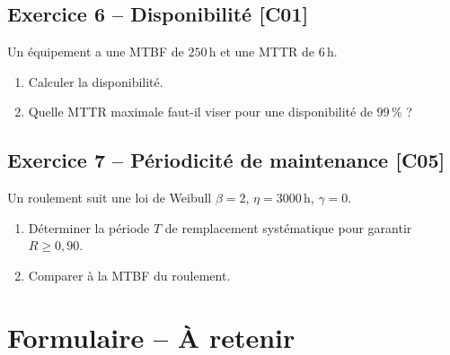 \documentclass[a4paper,11pt]{article}
\begin{document}
\subsection*{Exercice 6 -- Disponibilité \hfill {\normalsize\color{uimmred}[C01]}}
Un équipement a une MTBF de $250$\,h et une MTTR de $6$\,h.
\begin{enumerate}[label=\alph*)]
  \item Calculer la disponibilité.
  \item Quelle MTTR maximale faut-il viser pour une disponibilité de $99\,\%$ ?
\end{enumerate}

\subsection*{Exercice 7 -- Périodicité de maintenance \hfill {\normalsize\color{uimmred}[C05]}}
Un roulement suit une loi de Weibull $\beta = 2$, $\eta = 3000$\,h, $\gamma = 0$.
\begin{enumerate}[label=\alph*)]
  \item Déterminer la période $T$ de remplacement systématique pour garantir $R \geq 0{,}90$.
  \item Comparer à la MTBF du roulement.
\end{enumerate}

\newpage
\section*{Formulaire -- À retenir}
\end{document}
